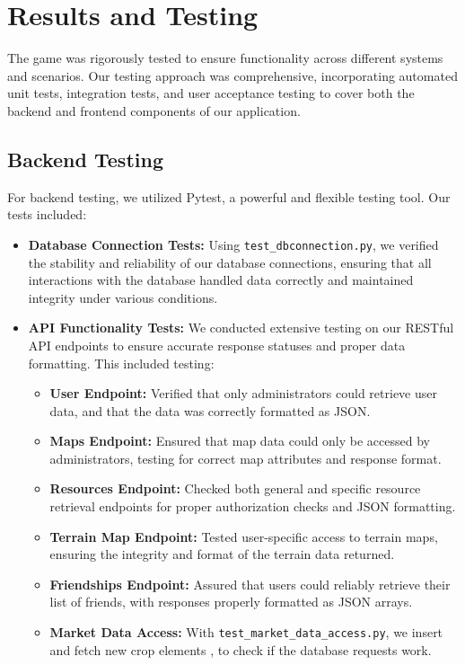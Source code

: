 \documentclass[12pt]{article}
\begin{document}
\section{Results and Testing}
The game was rigorously tested to ensure functionality across different systems and scenarios. Our testing approach was comprehensive, incorporating automated unit tests, integration tests, and user acceptance testing to cover both the backend and frontend components of our application.
\subsection{Backend Testing}
For backend testing, we utilized Pytest, a powerful and flexible testing tool. Our tests included:
\begin{itemize}
    \item \textbf{Database Connection Tests:} Using \texttt{test\_dbconnection.py}, we verified the stability and reliability of our database connections, ensuring that all interactions with the database handled data correctly and maintained integrity under various conditions.
    \item \textbf{API Functionality Tests:} We conducted extensive testing on our RESTful API endpoints to ensure accurate response statuses and proper data formatting. This included testing:
        \begin{itemize}
            \item \textbf{User Endpoint:} Verified that only administrators could retrieve user data, and that the data was correctly formatted as JSON.
            \item \textbf{Maps Endpoint:} Ensured that map data could only be accessed by administrators, testing for correct map attributes and response format.
            \item \textbf{Resources Endpoint:} Checked both general and specific resource retrieval endpoints for proper authorization checks and JSON formatting.
            \item \textbf{Terrain Map Endpoint:} Tested user-specific access to terrain maps, ensuring the integrity and format of the terrain data returned.
            \item \textbf{Friendships Endpoint:} Assured that users could reliably retrieve their list of friends, with responses properly formatted as JSON arrays.
            \item \textbf{Market Data Access:} With \texttt{test\_market\_data\_access.py}, we insert and fetch new crop elements , to check if the database requests work.

\end{itemize}
\end{itemize}
\end{document}
